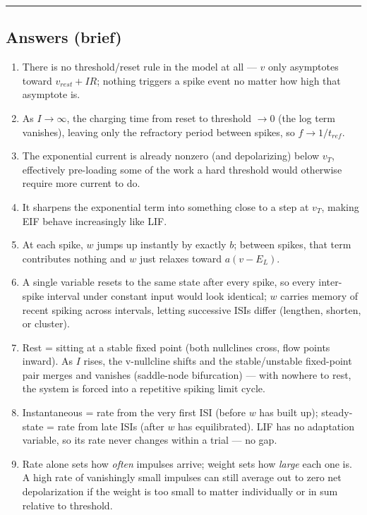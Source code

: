 \documentclass[11pt,a4paper]{article}
\begin{document}
	\newpage
\vspace{0.3cm}
\begin{center}\rule{0.4\textwidth}{0.4pt}\end{center}
\subsection*{Answers (brief)}
{\small
\begin{enumerate}[itemsep=2pt, leftmargin=1.6em]
  \item There is no threshold/reset rule in the model at all — $v$ only asymptotes toward $v_{rest}+IR$; nothing triggers a spike event no matter how high that asymptote is.
  \item As $I\to\infty$, the charging time from reset to threshold $\to 0$ (the log term vanishes), leaving only the refractory period between spikes, so $f \to 1/t_{ref}$.
  \item The exponential current is already nonzero (and depolarizing) below $v_T$, effectively pre-loading some of the work a hard threshold would otherwise require more current to do.
  \item It sharpens the exponential term into something close to a step at $v_T$, making EIF behave increasingly like LIF.
  \item At each spike, $w$ jumps up instantly by exactly $b$; between spikes, that term contributes nothing and $w$ just relaxes toward $a(v-E_L)$.
  \item A single variable resets to the same state after every spike, so every inter-spike interval under constant input would look identical; $w$ carries memory of recent spiking across intervals, letting successive ISIs differ (lengthen, shorten, or cluster).
  \item Rest = sitting at a stable fixed point (both nullclines cross, flow points inward). As $I$ rises, the v-nullcline shifts and the stable/unstable fixed-point pair merges and vanishes (saddle-node bifurcation) — with nowhere to rest, the system is forced into a repetitive spiking limit cycle.
  \item Instantaneous = rate from the very first ISI (before $w$ has built up); steady-state = rate from late ISIs (after $w$ has equilibrated). LIF has no adaptation variable, so its rate never changes within a trial — no gap.
  \item Rate alone sets how \emph{often} impulses arrive; weight sets how \emph{large} each one is. A high rate of vanishingly small impulses can still average out to zero net depolarization if the weight is too small to matter individually or in sum relative to threshold.

\end{enumerate}}
\end{document}
